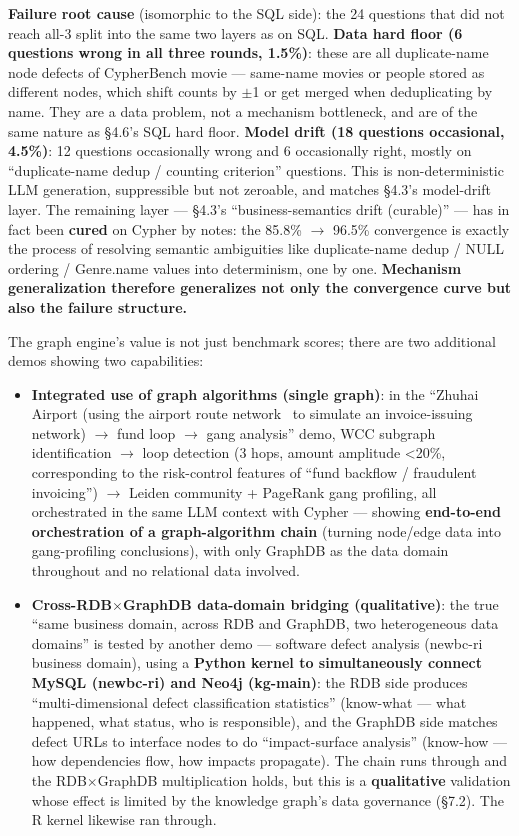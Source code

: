 \documentclass[11pt]{article}
\begin{document}
\textbf{Failure root cause} (isomorphic to the SQL side): the 24 questions that did not reach all-3 split into the same two layers as on SQL.  \textbf{Data hard floor (6 questions wrong in all three rounds, 1.5\%)}: these are all duplicate-name node defects of CypherBench movie --- same-name movies or people stored as different nodes, which shift counts by $\pm$1 or get merged when deduplicating by name. They are a data problem, not a mechanism bottleneck, and are of the same nature as \S{}4.6's SQL hard floor.  \textbf{Model drift (18 questions occasional, 4.5\%)}: 12 questions occasionally wrong and 6 occasionally right, mostly on ``duplicate-name dedup / counting criterion'' questions. This is non-deterministic LLM generation, suppressible but not zeroable, and matches \S{}4.3's model-drift layer. The remaining layer --- \S{}4.3's ``business-semantics drift (curable)'' --- has in fact been \textbf{cured} on Cypher by notes: the 85.8\% $\rightarrow$ 96.5\% convergence is exactly the process of resolving semantic ambiguities like duplicate-name dedup / NULL ordering / Genre.name values into determinism, one by one. \textbf{Mechanism generalization therefore generalizes not only the convergence curve but also the failure structure.}

The graph engine's value is not just benchmark scores; there are two additional demos showing two capabilities:

\begin{itemize}
\item
  \textbf{Integrated use of graph algorithms (single graph)}: in the ``Zhuhai Airport (using the airport route network~\cite{neo4j-airport-routes} to simulate an invoice-issuing network) $\rightarrow$ fund loop $\rightarrow$ gang analysis'' demo, WCC subgraph identification $\rightarrow$ loop detection (3 hops, amount amplitude \textless20\%, corresponding to the risk-control features of ``fund backflow / fraudulent invoicing'') $\rightarrow$ Leiden community + PageRank gang profiling, all orchestrated in the same LLM context with Cypher --- showing \textbf{end-to-end orchestration of a graph-algorithm chain} (turning node/edge data into gang-profiling conclusions), with only GraphDB as the data domain throughout and no relational data involved.
\item
  \textbf{Cross-RDB$\times$GraphDB data-domain bridging (qualitative)}: the true ``same business domain, across RDB and GraphDB, two heterogeneous data domains'' is tested by another demo --- software defect analysis (newbc-ri business domain), using a \textbf{Python kernel to simultaneously connect MySQL (newbc-ri) and Neo4j (kg-main)}: the RDB side produces ``multi-dimensional defect classification statistics'' (know-what --- what happened, what status, who is responsible), and the GraphDB side matches defect URLs to interface nodes to do ``impact-surface analysis'' (know-how --- how dependencies flow, how impacts propagate). The chain runs through and the RDB$\times$GraphDB multiplication holds, but this is a \textbf{qualitative} validation whose effect is limited by the knowledge graph's data governance (\S{}7.2). The R kernel likewise ran through.
\end{itemize}
\end{document}
